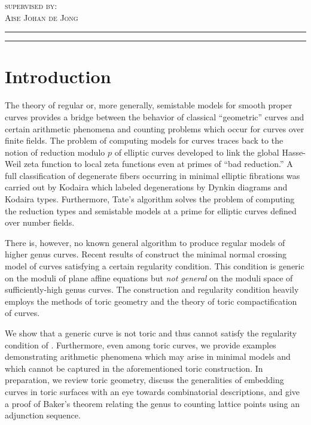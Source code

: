 \documentclass[12pt]{article}
\begin{document}
\begin{titlepage}
	\vspace{0.05 \textheight}
	
	{\textsc{supervised by:}}
	\\
	{\large\textsc{Aise Johan de Jong}}
	
	\vspace{0.1\textheight} %
	
	
	\rule{\textwidth}{0.4pt} %
	
	\vspace{2pt}\vspace{-\baselineskip} %
	
	\rule{\textwidth}{1pt} %
	
\end{titlepage}

\section{Introduction}

The theory of regular or, more generally, semistable models for smooth proper curves provides a bridge between the behavior of classical ``geometric'' curves and certain arithmetic phenomena and counting problems which occur for curves over finite fields. The problem of computing models for curves traces back to the notion of reduction modulo $p$ of elliptic curves developed to link the global Hasse-Weil zeta function to local zeta functions even at primes of ``bad reduction.'' A full classification of degenerate fibers occurring in minimal elliptic fibrations was carried out by Kodaira \cite{kodaira} which labeled degenerations by Dynkin diagrams and Kodaira types. Furthermore, Tate's algorithm \cite{tate} solves the problem of computing the reduction types and semistable models at a prime for elliptic curves defined over number fields.
\par
There is, however, no known general algorithm to produce regular models of higher genus curves. Recent results of \cite{tim} construct the minimal normal crossing model of curves satisfying a certain regularity condition. This condition is generic on the moduli of plane affine equations but \textit{not general} on the moduli space of sufficiently-high genus curves. The construction and regularity condition heavily employs the methods of toric geometry and the theory of toric compactification of curves.
\par
We show that a generic curve is not toric and thus cannot satisfy the regularity condition of \cite{tim}. Furthermore, even among toric curves, we provide examples demonstrating arithmetic phenomena which may arise in minimal models and which cannot be captured in the aforementioned toric construction. In preparation, we review toric geometry, discuss the generalities of embedding curves in toric surfaces with an eye towards combinatorial descriptions, and give a proof of Baker's theorem relating the genus to counting lattice points using an adjunction sequence.
\end{document}

